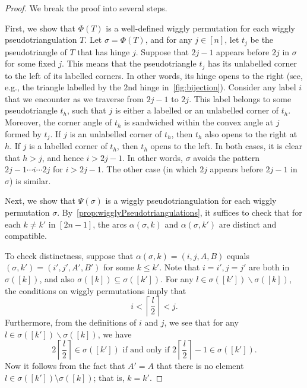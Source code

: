 \documentclass{amsart}
\theoremstyle{definition}
\newcommand{\ssm}{\smallsetminus} %
\begin{document}
\begin{proof}
  We break the proof into several steps.

  First, we show that \(\Phi(T)\) is a well-defined wiggly permutation for each wiggly pseudotriangulation \(T\).
  Let \(\sigma = \Phi(T)\), and for any \(j \in [n]\), let \(t_j\) be the pseudotriangle of \(T\) that has hinge \(j\).
  Suppose that \(2j-1\) appears before \(2j\) in \(\sigma\) for some fixed \(j\).
  This means that the pseudotriangle \(t_j\) has its unlabelled corner to the left of its labelled corners.
  In other words, its hinge opens to the right (see, e.g., the triangle labelled by the \(2\)nd hinge in~\cref{fig:bijection}).
  Consider any label \(i\) that we encounter as we traverse from \(2j-1\) to \(2j\).
  This label belongs to some pseudotriangle \(t_h\), such that \(j\) is either a labelled or an unlabelled corner of \(t_h\).
  Moreover, the corner angle of \(t_h\) is sandwiched within the convex angle at \(j\) formed by \(t_j\).
  If \(j\) is an unlabelled corner of \(t_h\), then \(t_h\) also opens to the right at \(h\).
  If \(j\) is a labelled corner of \(t_h\), then \(t_h\) opens to the left.
  In both cases, it is clear that \(h > j\), and hence \(i > 2j-1\).
  In other words, \(\sigma\) avoids the pattern \(2j-1 \cdots i \cdots 2j\) for \(i > 2j-1\).
  The other case (in which \(2j\) appears before \(2j-1\) in \(\sigma\)) is similar.
  
  Next, we show that \(\Psi(\sigma)\) is a wiggly pseudotriangulation for each wiggly permutation \(\sigma\).
  By~\cref{prop:wigglyPseudotriangulations}, it suffices to check that for each \(k \neq k'\) in \([2n-1]\), the arcs 
  \(\alpha(\sigma,k)\) and \(\alpha(\sigma,k')\) are distinct and compatible.
  
  To check distinctness, suppose that \(\alpha(\sigma,k) = (i,j,A,B)\) equals \((\sigma,k') = (i',j',A',B')\) for some \(k \leq k'\).
  Note that \(i = i',j = j'\) are both in \(\sigma([k])\), and also \(\sigma([k]) \subseteq \sigma([k'])\).
  For any \(l \in \sigma([k']) \ssm \sigma([k])\), the conditions on wiggly permutations imply that
  \[i < \left\lceil \frac{l}{2} \right\rceil < j.\]
  Furthermore, from the definitions of \(i\) and \(j\), we see that for any \(l \in \sigma([k']) \ssm \sigma([k])\), we have
  \[2 \left\lceil \frac{l}{2} \right\rceil \in \sigma([k']) \text{ if and only if } 2\left\lceil \frac{l}{2} \right\rceil - 1 \in \sigma([k']).\]
  Now it follows from the fact that \(A' = A\) that there is no element \(l \in \sigma([k']) \setminus \sigma([k])\); that is, \(k = k'\).


\end{proof}
\end{document}
